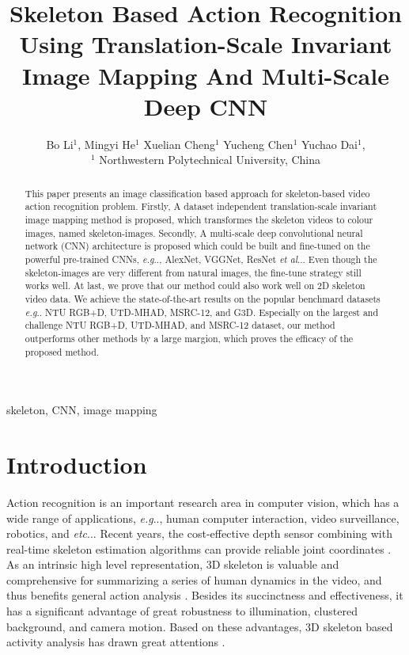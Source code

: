 \documentclass[10pt,journal]{IEEEtran}
\makeatletter
\DeclareRobustCommand\onedot{\futurelet\@let@token\@onedot}
\def\@onedot{\ifx\@let@token.\else.\null\fi\xspace}
\def\eg{\emph{e.g}\onedot} \def\Eg{\emph{E.g}\onedot}
\def\etc{\emph{etc}\onedot} \def\vs{\emph{vs}\onedot}
\def\etal{\emph{et al}\onedot}
\makeatother
\begin{document}
\title{Skeleton Based Action Recognition Using Translation-Scale Invariant Image Mapping And Multi-Scale Deep CNN}

\author{
Bo Li$^{1}$,
Mingyi He$^1$
Xuelian Cheng$^1$
Yucheng Chen$^1$
Yuchao Dai$^{1}$,

$^1$ Northwestern Polytechnical University, China
}

\maketitle

\begin{abstract}
This paper presents an image classification based approach for skeleton-based video action recognition problem. Firstly, A dataset independent translation-scale invariant image mapping method is proposed, which transformes the skeleton videos to colour images, named skeleton-images. Secondly, A multi-scale deep convolutional neural network (CNN) architecture is proposed which could be built  and fine-tuned on the powerful pre-trained CNNs, \eg, AlexNet, VGGNet, ResNet \etal. Even though the skeleton-images are very different from natural images, the fine-tune strategy still works well. 
At last, we prove that our method could also work well on 2D skeleton video data. We achieve the state-of-the-art results on the popular benchmard  datasets \eg NTU RGB+D, UTD-MHAD, MSRC-12, and G3D. Especially on the largest and challenge NTU RGB+D, UTD-MHAD, and MSRC-12 dataset, our method outperforms other methods by a large margion, which proves the efficacy of the proposed method.

\end{abstract}
\begin{IEEEkeywords}
skeleton, CNN, image mapping
\end{IEEEkeywords}

\section{Introduction}
\label{sec:intro}
Action recognition is an important research area in computer vision, which has a wide range of applications, \eg, human computer interaction, video surveillance, robotics, and \etc. Recent years, the cost-effective depth sensor combining with real-time skeleton estimation algorithms can provide reliable joint coordinates \cite{Shotton2013Efficient}. As an intrinsic high level representation, 3D skeleton is valuable and comprehensive for summarizing a series of human dynamics in the video, and thus benefits general action analysis \cite{Liu2017PKU}. Besides its succinctness and effectiveness, it has a significant advantage of great robustness to illumination, clustered background, and camera motion. Based on these advantages, 3D skeleton based activity analysis has drawn great attentions \cite{Zanfir2013The, Gowayyed2013Histogram, Vemulapalli2014Human, Vemulapalli2016Rolling, Ohnbar2013Joint, Du2015Hierarchical, Veeriah2015Differential, Zhu2016Co, Shahroudy2016NTU, Liu2016Spatio, Song2016An,Du2016Representation}.
\end{document}
